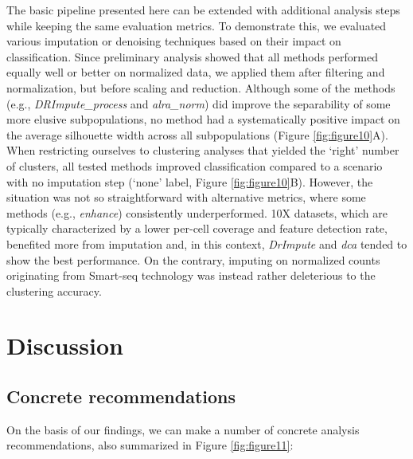 \documentclass[11pt]{article}
\begin{document}
The basic pipeline presented here can be extended with additional analysis steps while keeping the same evaluation metrics. To demonstrate this, we evaluated various imputation or denoising techniques based on their impact on classification. Since preliminary analysis showed that all methods performed equally well or better on normalized data, we applied them after filtering and normalization, but before scaling and reduction. Although some of the methods (e.g., \textit{DRImpute\_process} and \textit{alra\_norm}) did improve the separability of some more elusive subpopulations, no method had a systematically positive impact on the average silhouette width across all subpopulations (Figure \ref{fig:figure10}A). When restricting ourselves to clustering analyses that yielded the `right' number of clusters, all tested methods improved classification  compared to a scenario with no imputation step (`none' label, Figure \ref{fig:figure10}B). However, the situation was not so straightforward with alternative metrics, where some methods (e.g., \textit{enhance}) consistently underperformed. 10X datasets, which are typically characterized by a lower per-cell coverage and feature detection rate, benefited more from imputation and, in this context, \textit{DrImpute} and \textit{dca} tended to show the best performance. On the contrary, imputing on normalized counts originating from Smart-seq technology was instead rather deleterious to the clustering accuracy. 




\section*{Discussion}

\subsection*{Concrete recommendations}

On the basis of our findings, we can make a number of concrete analysis recommendations, also summarized in Figure \ref{fig:figure11}:
\end{document}

